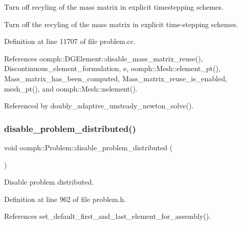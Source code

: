 Turn off recyling of the mass matrix in explicit timestepping schemes. 

Turn off the recyling of the mass matrix in explicit time-\/stepping schemes. 

Definition at line 11707 of file problem.\+cc.



References oomph\+::\+D\+G\+Element\+::disable\+\_\+mass\+\_\+matrix\+\_\+reuse(), Discontinuous\+\_\+element\+\_\+formulation, e, oomph\+::\+Mesh\+::element\+\_\+pt(), Mass\+\_\+matrix\+\_\+has\+\_\+been\+\_\+computed, Mass\+\_\+matrix\+\_\+reuse\+\_\+is\+\_\+enabled, mesh\+\_\+pt(), and oomph\+::\+Mesh\+::nelement().



Referenced by doubly\+\_\+adaptive\+\_\+unsteady\+\_\+newton\+\_\+solve().

\mbox{\label{classoomph_1_1Problem_a79752d23035158783ad19711027984dc}} 
\subsubsection{\texorpdfstring{disable\+\_\+problem\+\_\+distributed()}{disable\_problem\_distributed()}}
{\footnotesize\ttfamily void oomph\+::\+Problem\+::disable\+\_\+problem\+\_\+distributed (\begin{DoxyParamCaption}{ }\end{DoxyParamCaption})\hspace{0.3cm}{\ttfamily [inline]}}



Disable problem distributed. 



Definition at line 962 of file problem.\+h.



References set\+\_\+default\+\_\+first\+\_\+and\+\_\+last\+\_\+element\+\_\+for\+\_\+assembly().

\mbox{\label{classoomph_1_1Problem_ac23468bc4101d3038e6b537b6fc87aa6}} 
